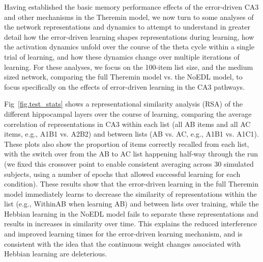 \documentclass[11pt,twoside]{article}
\newif\myifpdf
\begin{document}
Having established the basic memory performance effects of the error-driven CA3 and other mechanisms in the Theremin model, we now turn to some analyses of the network representations and dynamics to attempt to understand in greater detail how the error-driven learning shapes representations during learning, how the activation dynamics unfold over the course of the theta cycle within a single trial of learning, and how these dynamics change over multiple iterations of learning.  For these analyses, we focus on the 100-item list size, and the medium sized network, comparing the full Theremin model vs. the NoEDL model, to focus specifically on the effects of error-driven learning in the CA3 pathways.

Fig~\ref{fig.test_stats} shows a representational similarity analysis (RSA) of the different hippocampal layers over the course of learning, comparing the average correlation of representations in CA3 within each list (all AB items and all AC items, e.g., A1B1 vs. A2B2) and between lists (AB vs. AC, e.g., A1B1 vs. A1C1).  These plots also show the proportion of items correctly recalled from each list, with the switch over from the AB to AC list happening half-way through the run (we fixed this crossover point to enable consistent averaging across 30 simulated subjects, using a number of epochs that allowed successful learning for each condition).  These results show that the error-driven learning in the full Theremin model immediately learns to decrease the similarity of representations within the list (e.g., WithinAB when learning AB) and between lists over training, while the Hebbian learning in the NoEDL model fails to separate these representations and results in increases in similarity over time.  This explains the reduced interference and improved learning times for the error-driven learning mechanism, and is consistent with the idea that the continuous weight changes associated with Hebbian learning are deleterious.
\end{document}
